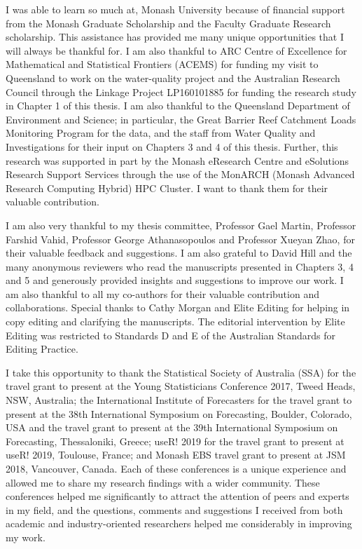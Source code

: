 \documentclass{monashthesis}
\theoremstyle{definition}
\theoremstyle{definition}
\theoremstyle{definition}
\theoremstyle{remark}
\begin{document}
I was able to learn so much at, Monash University because of financial support from the Monash Graduate Scholarship and the Faculty Graduate Research scholarship. This assistance has provided me many unique opportunities that I will always be thankful for. I am also thankful to ARC Centre of Excellence for Mathematical and Statistical Frontiers (ACEMS) for funding my visit to Queensland to work on the water-quality project and the Australian Research Council through the Linkage Project LP160101885 for funding the research study in Chapter 1 of this thesis. I am also thankful to the Queensland Department of Environment and Science; in particular, the Great Barrier Reef Catchment Loads Monitoring Program for the data, and the staff from Water Quality and Investigations for their input on Chapters 3 and 4 of this thesis. Further, this research was supported in part by the Monash eResearch Centre and eSolutions Research Support Services through the use of the MonARCH (Monash Advanced Research Computing Hybrid) HPC Cluster. I want to thank them for their valuable contribution.

I am also very thankful to my thesis committee, Professor Gael Martin, Professor Farshid Vahid, Professor George Athanasopoulos and Professor Xueyan Zhao, for their valuable feedback and suggestions. I am also grateful to David Hill and the many anonymous reviewers who read the manuscripts presented in Chapters 3, 4 and 5 and generously provided insights and suggestions to improve our work. I am also thankful to all my co-authors for their valuable contribution and collaborations. Special thanks to Cathy Morgan and Elite Editing for helping in copy editing and clarifying the manuscripts. The editorial intervention by Elite Editing was restricted to Standards D and E of the Australian Standards for Editing Practice.

I take this opportunity to thank the Statistical Society of Australia (SSA) for the travel grant to present at the Young Statisticians Conference 2017, Tweed Heads, NSW, Australia; the International Institute of Forecasters for the travel grant to present at the 38th International Symposium on Forecasting, Boulder, Colorado, USA and the travel grant to present at the 39th International Symposium on Forecasting, Thessaloniki, Greece; useR! 2019 for the travel grant to present at useR! 2019, Toulouse, France; and Monash EBS travel grant to present at JSM 2018, Vancouver, Canada. Each of these conferences is a unique experience and allowed me to share my research findings with a wider community. These conferences helped me significantly to attract the attention of peers and experts in my field, and the questions, comments and suggestions I received from both academic and industry-oriented researchers helped me considerably in improving my work.
\end{document}
